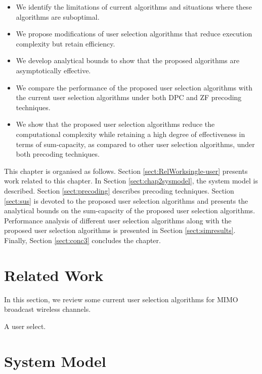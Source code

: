 \documentclass[a4paper,twoside,phd]{BYUPhys}
\begin{document}
\begin{itemize}

\item We identify the limitations of current algorithms and situations where these algorithms are suboptimal.

\item We propose modifications of user selection algorithms that reduce execution complexity but retain efficiency.

\item We develop analytical bounds to show that the proposed algorithms are asymptotically effective.

\item We compare the performance of the proposed user selection algorithms with the current user selection algorithms under both DPC and ZF precoding techniques.

\item We show that the proposed user selection algorithms reduce the computational complexity while retaining a high degree of effectiveness in terms of sum-capacity, as compared to other user selection algorithms, under both precoding techniques.

\end{itemize}


This chapter is organised as follows. Section \ref{sect:RelWorksingle-user} presents work related to this chapter. In Section \ref{sect:chap2sysmodel}, the system model is described. Section \ref{sect:precoding} describes precoding techniques. Section \ref{sect:sus} is devoted to the proposed user selection algorithms and presents the analytical bounds on the sum-capacity of the proposed user selection algorithms. Performance analysis of different user selection algorithms along with the proposed user selection algorithms is presented in Section \ref{sect:simresults}. Finally, Section \ref{sect:conc3} concludes the chapter.

\section{Related Work \label{sect:RelWorksingle-user}}

In this section, we review some current user selection algorithms for MIMO broadcast wireless channels.


A user select.

\section{System Model \label{sect:chap2sysmodel}}
\end{document}
